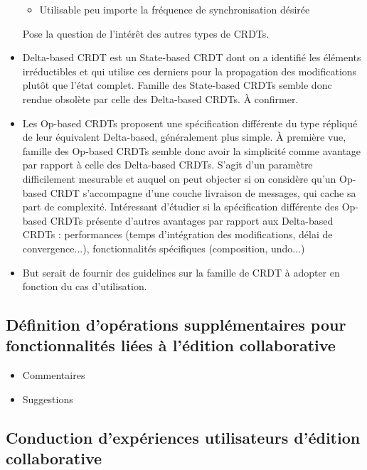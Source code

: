 \documentclass[12pt]{thesul}
\begin{document}
\begin{itemize}
\begin{itemize}
      \item Utilisable peu importe la fréquence de synchronisation désirée
    \end{itemize}
    Pose la question de l'intérêt des autres types de CRDTs.
  \item Delta-based CRDT est un State-based CRDT dont on a identifié les éléments irréductibles et qui utilise ces derniers pour la propagation des modifications plutôt que l'état complet.
    Famille des State-based CRDTs semble donc rendue obsolète par celle des Delta-based CRDTs.
    À confirmer.
  \item Les Op-based CRDTs proposent une spécification différente du type répliqué de leur équivalent Delta-based, généralement plus simple.
    À première vue, famille des Op-based CRDTs semble donc avoir la simplicité comme avantage par rapport à celle des Delta-based CRDTs.
    S'agit d'un paramètre difficilement mesurable et auquel on peut objecter si on considère qu'un Op-based CRDT s'accompagne d'une couche livraison de messages, qui cache sa part de complexité.
    Intéressant d'étudier si la spécification différente des Op-based CRDTs présente d'autres avantages par rapport aux Delta-based CRDTs : performances (temps d'intégration des modifications, délai de convergence...), fonctionnalités spécifiques (composition, undo...)
  \item But serait de fournir des guidelines sur la famille de CRDT à adopter en fonction du cas d'utilisation.
\end{itemize}

\subsection{Définition d'opérations supplémentaires pour fonctionnalités liées à l'édition collaborative}

\begin{itemize}
  \item Commentaires
  \item Suggestions
\end{itemize}

\subsection{Conduction d'expériences utilisateurs d'édition collaborative}
\end{document}
